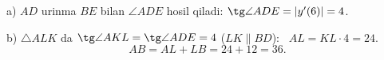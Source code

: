a) $AD$ urinma $BE$ bilan $\angle ADE$ hosil qiladi: $\tg\angle ADE=|y'(6)|=4$.

b) $\triangle ALK$ da $\tg\angle AKL=\tg\angle ADE=4$ ($LK\parallel BD$): \ $AL=KL\cdot4=24$.
\[AB=AL+LB=24+12=36.\]

\ShowJavoblar


